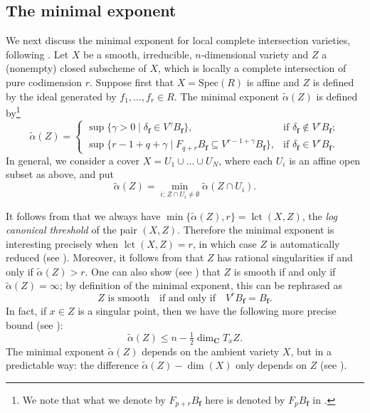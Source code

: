 \documentclass[11pt]{article}
\numberwithin{equation}{section}
\theoremstyle{plain}
\theoremstyle{definition}
\newcommand\C{{\mathbf C}}
\newcommand\bff{{\boldsymbol f}}
\DeclareMathOperator{\lct}{lct}
\begin{document}
\subsection{The minimal exponent}\label{section_min_exponent}
We next discuss the minimal exponent for local complete intersection varieties, following \cite{CDMO}. Let $X$ be a smooth,
irreducible, $n$-dimensional variety and $Z$ a (nonempty) closed subscheme of $X$, which is locally a complete intersection of pure codimension $r$. Suppose first
that $X=\mathrm{Spec}(R)$ is affine
and $Z$ is defined by the ideal generated by $f_1,\ldots,f_r\in R$. The minimal exponent $\widetilde{\alpha}(Z)$ is defined by\footnote{We note that what we
denote by $F_{p+r}B_{\bff}$ here is denoted by $F_pB_{\bff}$ in \cite{CDMO}.}
\begin{equation}\label{eq3_intro_v2}
\widetilde{\alpha}(Z)
=
\begin{cases}
\sup\{\gamma>0\mid \delta_\bff\in V^{\gamma}B_{\bff}\}, & \text{if}\,\,\delta_\bff\not\in V^rB_\bff; \\
\sup\{r-1+q+\gamma\mid F_{q+r}B_{\bff}\subseteq V^{r-1+\gamma}B_{\bff}\}, & \text{if}\,\,\delta_\bff\in V^rB_\bff.
\end{cases}
\end{equation}
In general, we consider a cover $X=U_1\cup\ldots\cup U_N$, where each $U_i$ is an affine open subset as above, and put
\[\widetilde{\alpha}(Z)=\min_{i;\,Z\cap U_i\neq\emptyset}\widetilde{\alpha}(Z\cap U_i).\]

It follows from \cite[Th.\,1]{BMS} that we always have $\min\big\{\widetilde{\alpha}(Z),r\big\}=\lct(X,Z)$, the \emph{log canonical threshold} of the pair $(X,Z)$. Therefore the minimal exponent is interesting
precisely when $\lct(X,Z)=r$, in which case $Z$ is automatically reduced (see \cite[Rem.\,4.2]{CDMO}). Moreover, it follows from \cite[Cor.\,1.7]{CDMO}
that $Z$ has rational singularities if and only if $\widetilde{\alpha}(Z)>r$. One can also show (see \cite[Rem.\,4.15]{CDMO}) that $Z$ is smooth if and only if $\widetilde{\alpha}(Z)=\infty$; by definition
of the minimal exponent, this can be rephrased as
\begin{equation}\label{eq_char_V_smooth}
Z\,\,\text{is smooth}\quad\text{if and only if}\quad V^rB_{\bff}=B_{\bff}.
\end{equation}
In fact,
if $x\in Z$ is a singular point, then we have the following more precise bound (see \cite[Rem.\,4.21]{CDMO}):
\begin{equation}\label{eq_bd_min_exp}
\widetilde{\alpha}(Z)\leq n-\tfrac{1}{2}\dim_{\C}T_xZ.
\end{equation}
The minimal exponent $\widetilde{\alpha}(Z)$ depends on the ambient variety $X$, but in a predictable way: the difference $\widetilde{\alpha}(Z)-\dim(X)$
only depends on $Z$ (see \cite[Prop.\,4.14]{CDMO}).
\end{document}
